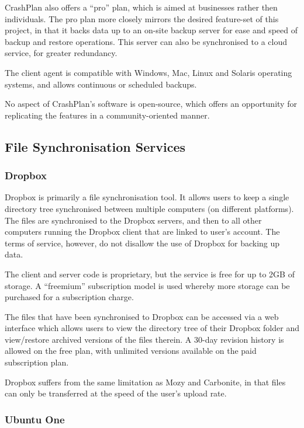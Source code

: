 CrashPlan also offers a ``pro'' plan, which is aimed at businesses rather then
individuals. The pro plan more closely mirrors the desired feature-set of this
project, in that it backs data up to an on-site backup server for ease and
speed of backup and restore operations. This server can also be synchronised to
a cloud service, for greater redundancy.

The client agent is compatible with Windows, Mac, Linux and Solaris operating
systems, and allows continuous or scheduled backups.

No aspect of CrashPlan's software is open-source, which offers an opportunity
for replicating the features in a community-oriented manner.

\subsection{File Synchronisation Services}

\subsubsection{Dropbox}

Dropbox is primarily a file synchronisation tool. It allows users to keep
a single directory tree synchronised between multiple computers (on different
platforms). The files are synchronised to the Dropbox servers, and then to all
other computers running the Dropbox client that are linked to user's
account\cite{Dropbox}.  The terms of service, however, do not disallow the use
of Dropbox for backing up data\cite{Dropbox-terms}.

The client and server code is proprietary, but the service is free for up to
2GB of storage. A ``freemium'' subscription model is used whereby more storage
can be purchased for a subscription charge\cite{Dropbox}.

The files that have been synchronised to Dropbox can be accessed via a web
interface which allows users to view the directory tree of their Dropbox folder
and view/restore archived versions of the files therein. A 30-day revision
history is allowed on the free plan, with unlimited versions available on the
paid subscription plan\cite{Dropbox}.

Dropbox suffers from the same limitation as Mozy and Carbonite, in that files
can only be transferred at the speed of the user's upload rate.

\subsubsection{Ubuntu One}

